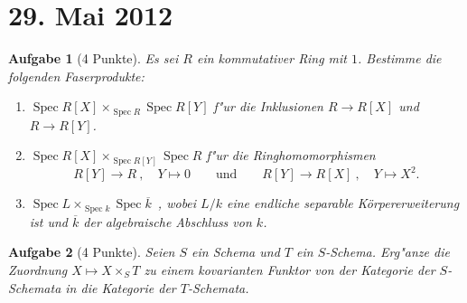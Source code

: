 \documentclass[paper = A4, fontsize=12pt, numbers=noendperiod, chapterprefix=true]{scrbook}
\theoremstyle{break}
\newtheorem{Aufg}{Aufgabe}
\theoremstyle{nonumberbreak}
\theoremstyle{nonumberplain}
\DeclareMathOperator{\Spec}{Spec}
\begin{document}
\newpage
\section{29. Mai 2012}
\setcounter{Aufg}{0}
\setcounter{Loes}{0}

\begin{Aufg}[4 Punkte]
Es sei $R$ ein kommutativer Ring mit $1$. Bestimme die folgenden Faserprodukte:
\begin{enumerate}%
 \item $\Spec R[X] \times_{\Spec R} \Spec R[Y]$ f"ur die Inklusionen $R\to R[X]$ und $R\to R[Y]$.
 \item $\Spec R[X] \times_{\Spec R[Y]} \Spec R$ f"ur die Ringhomomorphismen
 \[R[Y] \to R\ ,\quad Y \mapsto 0 \qquad \text{und}\qquad R[Y] \to R[X]\ , \quad Y \mapsto X^2.\]
 \item $\Spec L \times_{\Spec k} \Spec \overline{k}$\ , wobei $L/k$ eine endliche separable K\"orpererweiterung ist und $\overline{k}$ der algebraische Abschluss von $k$.
\end{enumerate}
\end{Aufg}


\begin{Aufg}[4 Punkte]
Seien $S$ ein Schema und $T$ ein $S$-Schema. Erg"anze die Zuordnung $X \mapsto X \times_S T$ zu einem kovarianten Funktor von der Kategorie der $S$-Schemata in die Kategorie der $T$-Schemata.
\end{Aufg}
\end{document}
